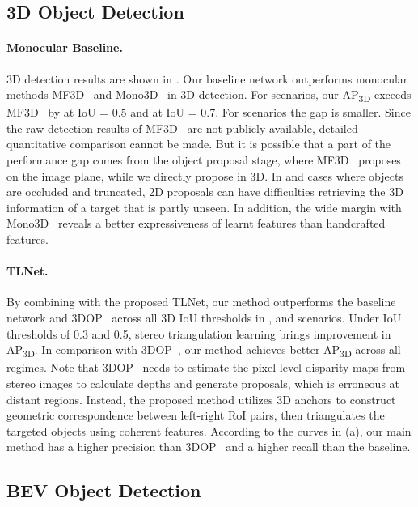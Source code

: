 \vspace{-0.2cm}
\subsection{3D Object Detection}

\paragraph{Monocular Baseline.} 3D detection results are shown in \tab{\ref{tab:3dap}}. Our baseline network outperforms monocular methods MF3D~\cite{xu2018multifusion} and Mono3D~\cite{chen2016monocular} in 3D detection. For  scenarios, our AP\textsubscript{3D} exceeds MF3D~\cite{xu2018multifusion} by  at IoU = 0.5 and  at IoU = 0.7. For  scenarios the gap is smaller. Since the raw detection results of MF3D~\cite{xu2018multifusion} are not publicly available, detailed quantitative comparison cannot be made. But it is possible that a part of the performance gap comes from the object proposal stage, where MF3D~\cite{xu2018multifusion} proposes on the image plane, while we directly propose in 3D. In  and  cases where objects are occluded and truncated, 2D proposals can have difficulties retrieving the 3D information of a target that is partly unseen. In addition, the wide margin with Mono3D~\cite{chen2016monocular} reveals a better expressiveness of learnt features than handcrafted features.
\paragraph{TLNet.} By combining with the proposed TLNet, our method outperforms the baseline network and 3DOP~\cite{chen20153dop} across all 3D IoU thresholds in ,  and  scenarios. Under IoU thresholds of 0.3 and 0.5, stereo triangulation learning brings  improvement in AP\textsubscript{3D}. In comparison with 3DOP~\cite{chen20153dop}, our method achieves  better AP\textsubscript{3D} across all regimes. Note that 3DOP~\cite{chen20153dop} needs to estimate the pixel-level disparity maps from stereo images to calculate depths and generate proposals, which is erroneous at distant regions. Instead, the proposed method utilizes 3D anchors to construct geometric correspondence between left-right RoI pairs, then triangulates the targeted objects using coherent features. According to the curves in \fig{\ref{fig:apcurves}} (a), our main method has a higher precision than 3DOP~\cite{chen20153dop} and a higher recall than the baseline.

\subsection{BEV Object Detection}

